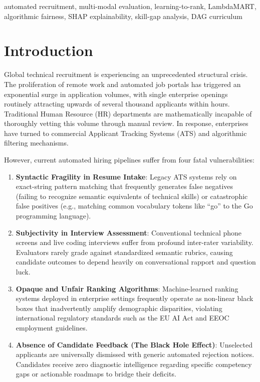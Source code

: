 \documentclass[conference]{IEEEtran}
\begin{document}
\begin{IEEEkeywords}
automated recruitment, multi-modal evaluation, learning-to-rank, LambdaMART, algorithmic fairness, SHAP explainability, skill-gap analysis, DAG curriculum
\end{IEEEkeywords}

\section{Introduction}
Global technical recruitment is experiencing an unprecedented structural crisis. The proliferation of remote work and automated job portals has triggered an exponential surge in application volumes, with single enterprise openings routinely attracting upwards of several thousand applicants within hours. Traditional Human Resource (HR) departments are mathematically incapable of thoroughly vetting this volume through manual review. In response, enterprises have turned to commercial Applicant Tracking Systems (ATS) and algorithmic filtering mechanisms.

However, current automated hiring pipelines suffer from four fatal vulnerabilities:
\begin{enumerate}
    \item \textbf{Syntactic Fragility in Resume Intake}: Legacy ATS systems rely on exact-string pattern matching that frequently generates false negatives (failing to recognize semantic equivalents of technical skills) or catastrophic false positives (e.g., matching common vocabulary tokens like ``go'' to the Go programming language).
    \item \textbf{Subjectivity in Interview Assessment}: Conventional technical phone screens and live coding interviews suffer from profound inter-rater variability. Evaluators rarely grade against standardized semantic rubrics, causing candidate outcomes to depend heavily on conversational rapport and question luck.
    \item \textbf{Opaque and Unfair Ranking Algorithms}: Machine-learned ranking systems deployed in enterprise settings frequently operate as non-linear black boxes that inadvertently amplify demographic disparities, violating international regulatory standards such as the EU AI Act and EEOC employment guidelines.
    \item \textbf{Absence of Candidate Feedback (The Black Hole Effect)}: Unselected applicants are universally dismissed with generic automated rejection notices. Candidates receive zero diagnostic intelligence regarding specific competency gaps or actionable roadmaps to bridge their deficits.
\end{enumerate}
\end{document}
